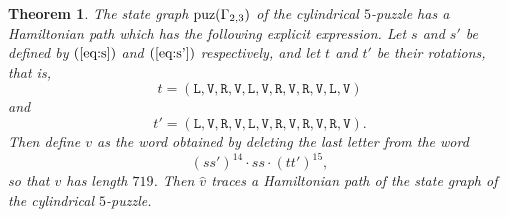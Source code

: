 \documentclass[lualatex,11pt]{article}
\newtheorem{thm}{Theorem}
\begin{document}
\begin{thm}
\label{thm:path}
The state graph ${\rm puz}(\Gamma_{2,3})$ of the cylindrical $5$-puzzle
has a Hamiltonian path which has the following explicit expression.
Let $s$ and $s'$ be defined by $(\ref{eq:s})$ and $(\ref{eq:s'})$
respectively, and let $t$ and $t'$ be their rotations, that is,
\[
t = (\mathtt{L}, \mathtt{V}, \mathtt{R}, 
\mathtt{V}, \mathtt{L}, \mathtt{V}, \mathtt{R}, \mathtt{V}, \mathtt{R}, \mathtt{V}, \mathtt{L},\mathtt{V})
\]
and
\[
t' = (\mathtt{L}, \mathtt{V}, \mathtt{R}, 
\mathtt{V}, \mathtt{L}, \mathtt{V}, \mathtt{R}, \mathtt{V}, \mathtt{R}, \mathtt{V}, \mathtt{R},\mathtt{V}).
\]
Then define $v$ as the word obtained by deleting the last letter from
the word
\[
 (ss')^{14}\cdot s s\cdot (tt')^{15},
\]
so that $v$ has length $719$.
Then $\hat{v}$ traces a Hamiltonian path of the state graph of the cylindrical $5$-puzzle.
\end{thm}
\end{document}
